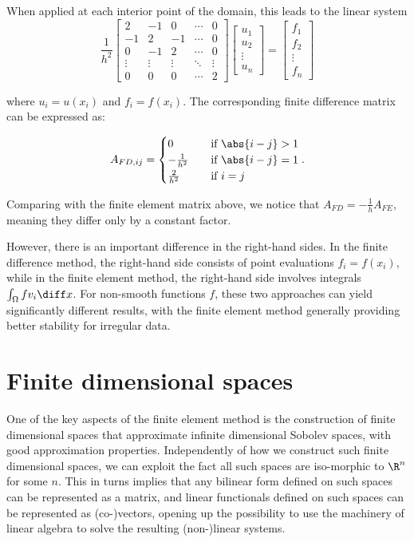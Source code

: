 When applied at each interior point of the domain, this leads to the linear system
\[
\frac{1}{h^2}
\begin{bmatrix}
2 & -1 & 0 & \cdots & 0 \\
-1 & 2 & -1 & \cdots & 0 \\
0 & -1 & 2 & \cdots & 0 \\
\vdots & \vdots & \vdots & \ddots & \vdots \\
0 & 0 & 0 & \cdots & 2
\end{bmatrix}
\begin{bmatrix}
u_1 \\
u_2 \\
\vdots \\
u_n
\end{bmatrix}
=
\begin{bmatrix}
f_1 \\
f_2 \\
\vdots \\
f_n
\end{bmatrix}
\]

where $u_i = u(x_i)$ and $f_i = f(x_i)$. The corresponding finite difference matrix can be expressed as:

\[
A_{FD,ij} = \begin{cases}
0 \quad &\text{if } \abs{i-j}>1 \\
-\frac{1}{h^2} \quad &\text{if } \abs{i-j}=1 \\
\frac{2}{h^2} \quad &\text{if } i=j
\end{cases}.
\]

Comparing with the finite element matrix above, we notice that $A_{FD} = -\frac{1}{h} A_{FE}$, meaning they differ only by a constant factor. 

However, there is an important difference in the right-hand sides. In the finite difference method, the right-hand side consists of point evaluations $f_i = f(x_i)$, while in the finite element method, the right-hand side involves integrals $\int_\Omega f v_i \diff x$. For non-smooth functions $f$, these two approaches can yield significantly different results, with the finite element method generally providing better stability for irregular data.

\section{Finite dimensional spaces}

One of the key aspects of the finite element method is the construction of
finite dimensional spaces that approximate infinite dimensional Sobolev spaces,
with good approximation properties. Independently of how we construct such
finite dimensional spaces, we can exploit the fact all such spaces are
iso-morphic to $\R^n$ for some $n$. This in turns implies that any bilinear form
defined on such spaces can be represented as a matrix, and linear functionals
defined on such spaces can be represented as (co-)vectors, opening up the
possibility to use the machinery of linear algebra to solve the resulting
(non-)linear systems.

